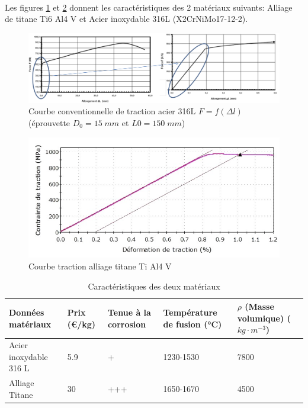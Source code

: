 
~\

Les figures \ref{fig21} et \ref{fig22} donnent les caractéristiques des 2 matériaux suivants: Alliage de titane Ti6 Al4 V et Acier inoxydable 316L (X2CrNiMo17-12-2).

\begin{figure}[ht]
\begin{center}
\includegraphics[width=0.75\linewidth]{img/fig21}
\caption{Courbe conventionnelle de traction acier 316L $F=f(\Delta l)$ (éprouvette $D_0=15\;mm$ et $L0=150\;mm$)}
\label{fig21}
\end{center}
\end{figure}

\begin{figure}[ht]
\begin{center}
\includegraphics[width=0.55\linewidth]{img/fig22}
\caption{Courbe traction alliage titane Ti Al4 V}
\label{fig22}
\end{center}
\end{figure}

\begin{table}
\begin{tabularx}{\textwidth}{|l|l|X|X|X|}
\hline
Données matériaux & Prix (€/kg) & Tenue à la corrosion & Température de fusion (°C) & $\rho$ (Masse volumique) ($kg\cdot m^{-3}$)\\
\hline
Acier inoxydable 316 L & 5.9 & + & 1230-1530& 7800 \\
\hline
Alliage Titane & 30 & +++ & 1650-1670 & 4500 \\
\hline
\end{tabularx}
\caption{Caractéristiques des deux matériaux}
\label{tab1}
\end{table}

